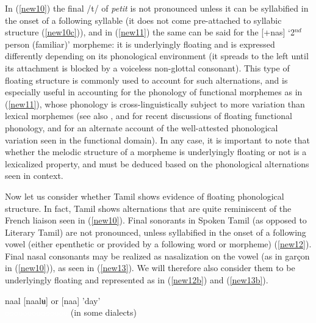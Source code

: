 \documentclass[output=paper,colorlinks,citecolor=brown,
]{langscibook}
\begin{document}
In (\ref{new10}) the final /t/ of \textit{petit} is not pronounced unless it can be syllabified in the onset of a following syllable (it does not come pre-attached to syllabic structure (\ref{new10c})), and in (\ref{new11}) the same can be said for the [+nas] ‘2$^{nd}$ person (familiar)’ morpheme: it is underlyingly floating and is expressed differently depending on its phonological environment (it spreads to the left until its attachment is blocked by a voiceless non-glottal consonant). This type of floating structure is commonly used to account for such alternations, and is especially useful in accounting for the phonology of functional morphemes as in (\ref{new11}), whose phonology is cross-linguistically subject to more variation than lexical morphemes (see also \citealt{FaustUlfsbjorninn2018}, and \citealt{newell2019functional} for recent discussions of floating functional phonology, and \citealt{Selkirk1996} for an alternate account of the well-attested phonological variation seen in the functional domain). In any case, it is important to note that whether the melodic structure of a morpheme is underlyingly floating or not is a lexicalized property, and must be deduced based on the phonological alternations seen in context. 

Now let us consider whether Tamil shows evidence of floating phonological structure. In fact, Tamil shows alternations that are quite reminiscent of the French liaison seen in (\ref{new10}). Final sonorants in Spoken Tamil (as opposed to Literary Tamil) are not pronounced, unless syllabified in the onset of a following vowel (either epenthetic or provided by a following word or morpheme) (\ref{new12}). Final nasal consonants may be realized as nasalization on the vowel (as in garçon in (\ref{new10})), as seen in (\ref{new13}). We will therefore also consider them to be underlyingly floating and represented as in (\ref{new12b}) and (\ref{new13b}).

\begin{exe}
\ex\label{new12}
\begin{xlist}
\ex \label{new12a}
naal	\hspace{2cm}	[naalʉ] or [naa] 	\hspace{2cm} 	'day' \\ \textcolor{white}{oooooooooooooo} (in some dialects)    


\ex \label{new12b}

{} 

\end{xlist}
\end{exe}
\end{document}
